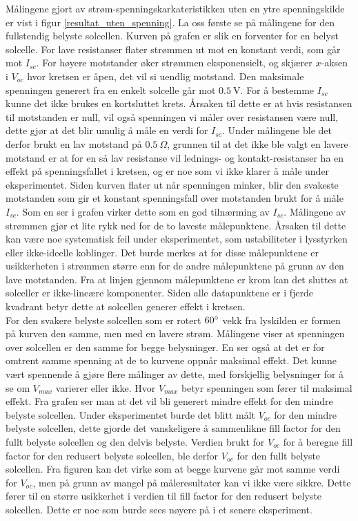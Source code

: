 \documentclass[%
 reprint,
 amsmath,amssymb,
 aps,
 norsk,
 booktabs
]{revtex4-1}
\begin{document}
Målingene gjort av strøm-spenningskarkateristikken uten en ytre spenningskilde er vist i figur \vref{resultat_uten_spenning}. La oss første se på målingene for den fullstendig belyste solcellen. Kurven på grafen er slik en forventer for en belyst solcelle. For lave resistanser flater strømmen ut mot en konstant verdi, som går mot $I_{sc}$. For høyere motstander øker strømmen eksponensielt, og skjærer $x$-aksen i $V_{oc}$ hvor kretsen er åpen, det vil si uendlig motstand. Den maksimale spenningen generert fra en enkelt solcelle går mot $\SI{0.5}{\volt}$. For å bestemme $I_{sc}$ kunne det ikke brukes en kortsluttet krets. Årsaken til dette er at hvis resistansen til motstanden er null, vil også spenningen vi måler over resistansen være null, dette gjør at det blir umulig å måle en verdi for $I_{sc}$. Under målingene ble det derfor brukt en lav motstand på $\SI{0.5}{\Omega}$, grunnen til at det ikke ble valgt en lavere motstand er at for en så lav resistanse vil lednings- og kontakt-resistanser ha en effekt på spenningsfallet i kretsen, og er noe som vi ikke klarer å måle under eksperimentet. Siden kurven flater ut når spenningen minker, blir den svakeste motstanden som gir et konstant spenningsfall over motstanden brukt for å måle $I_{sc}$. Som en ser i grafen virker dette som en god tilnærming av $I_{sc}$. Målingene av strømmen gjør et lite rykk ned for de to laveste målepunktene. Årsaken til dette kan være noe systematisk feil under eksperimentet, som ustabiliteter i lysstyrken eller ikke-ideelle koblinger. Det burde merkes at for disse målepunktene er usikkerheten i strømmen større enn for de andre målepunktene på grunn av den lave motstanden. Fra at linjen gjennom målepunktene er krom kan det sluttes at solceller er ikke-lineære komponenter. Siden alle datapunktene er i fjerde kvadrant betyr dette at solcellen generer effekt i kretsen. \\
For den svakere belyste solcellen som er rotert $60\degree$ vekk fra lyskilden er formen på kurven den samme, men med en lavere strøm. Målingene viser at spenningen over solcellen er den samme for begge belysninger. En ser også at det er for omtrent samme spenning at de to kurvene oppnår maksimal effekt. Det kunne vært spennende å gjøre flere målinger av dette, med forskjellig belysninger for å se om $V_{max}$ varierer eller ikke. Hvor $V_{max}$ betyr spenningen som fører til maksimal effekt. Fra grafen ser man at det vil bli generert mindre effekt for den mindre belyste solcellen. Under eksperimentet burde det blitt målt $V_{oc}$ for den mindre belyste solcellen, dette gjorde det vanskeligere å sammenlikne fill factor for den fullt belyste solcellen og den delvis belyste. Verdien brukt for $V_{oc}$ for å beregne fill factor for den redusert belyste solcellen, ble derfor $V_{oc}$ for den fullt belyste solcellen. Fra figuren kan det virke som at begge kurvene går mot samme verdi for $V_{oc}$, men på grunn av mangel på måleresultater kan vi ikke være sikkre. Dette fører til en større usikkerhet i verdien til fill factor for den redusert belyste solcellen. Dette er noe som burde sees nøyere på i et senere eksperiment.\par
\end{document}
